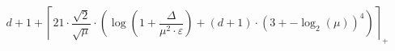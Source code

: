 \[d + 1 + \left\lceil 21 \cdot \frac{\sqrt{2}}{\sqrt{\mu}} \cdot \left(\log\left(1 + \frac{\Delta}{\mu^{2} \cdot \varepsilon}\right) + \left(d + 1\right) \cdot \left(3 + -\log_{2}\left(\mu\right)\right)^{4}\right) \right\rceil_{+}\]
